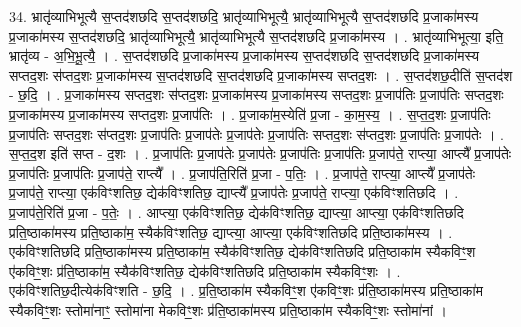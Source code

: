 \documentclass[17pt]{extarticle}
\begin{document}
34. भ्रातृ॑व्याभिभूत्यै स॒प्तद॑शछदि स॒प्तद॑शछदि॒ भ्रातृ॑व्याभिभूत्यै॒ भ्रातृ॑व्याभिभूत्यै स॒प्तद॑शछदि प्र॒जाका॑मस्य प्र॒जाका॑मस्य स॒प्तद॑शछदि॒ भ्रातृ॑व्याभिभूत्यै॒ भ्रातृ॑व्याभिभूत्यै स॒प्तद॑शछदि प्र॒जाका॑मस्य । . भ्रातृ॑व्याभिभूत्या॒ इति॒ भ्रातृ॑व्य - अ॒भि॒भू॒त्यै॒ । . स॒प्तद॑शछदि प्र॒जाका॑मस्य प्र॒जाका॑मस्य स॒प्तद॑शछदि स॒प्तद॑शछदि प्र॒जाका॑मस्य सप्तद॒शः स॑प्तद॒शः प्र॒जाका॑मस्य स॒प्तद॑शछदि स॒प्तद॑शछदि प्र॒जाका॑मस्य सप्तद॒शः । . स॒प्तद॑शछ॒दीति॑ स॒प्तद॑श - छ॒दि॒ । . प्र॒जाका॑मस्य सप्तद॒शः स॑प्तद॒शः प्र॒जाका॑मस्य प्र॒जाका॑मस्य सप्तद॒शः प्र॒जाप॑तिः प्र॒जाप॑तिः सप्तद॒शः प्र॒जाका॑मस्य प्र॒जाका॑मस्य सप्तद॒शः प्र॒जाप॑तिः । . प्र॒जाका॑म॒स्येति॑ प्र॒जा - का॒म॒स्य॒ । . स॒प्त॒द॒शः प्र॒जाप॑तिः प्र॒जाप॑तिः सप्तद॒शः स॑प्तद॒शः प्र॒जाप॑तिः प्र॒जाप॑तेः प्र॒जाप॑तेः प्र॒जाप॑तिः सप्तद॒शः स॑प्तद॒शः प्र॒जाप॑तिः प्र॒जाप॑तेः । . स॒प्त॒द॒श इति॑ सप्त - द॒शः । . प्र॒जाप॑तिः प्र॒जाप॑तेः प्र॒जाप॑तेः प्र॒जाप॑तिः प्र॒जाप॑तिः प्र॒जाप॑ते॒ राप्त्या॒ आप्त्यै᳚ प्र॒जाप॑तेः प्र॒जाप॑तिः प्र॒जाप॑तिः प्र॒जाप॑ते॒ राप्त्यै᳚ । . प्र॒जाप॑ति॒रिति॑ प्र॒जा - प॒तिः॒ । . प्र॒जाप॑ते॒ राप्त्या॒ आप्त्यै᳚ प्र॒जाप॑तेः प्र॒जाप॑ते॒ राप्त्या॒ एक॑विꣳशतिछ॒ द्येक॑विꣳशतिछ॒ द्याप्त्यै᳚ प्र॒जाप॑तेः प्र॒जाप॑ते॒ राप्त्या॒ एक॑विꣳशतिछदि । . प्र॒जाप॑ते॒रिति॑ प्र॒जा - प॒तेः॒ । . आप्त्या॒ एक॑विꣳशतिछ॒ द्येक॑विꣳशतिछ॒ द्याप्त्या॒ आप्त्या॒ एक॑विꣳशतिछदि प्रति॒ष्ठाका॑मस्य प्रति॒ष्ठाका॑म॒ स्यैक॑विꣳशतिछ॒ द्याप्त्या॒ आप्त्या॒ एक॑विꣳशतिछदि प्रति॒ष्ठाका॑मस्य । . एक॑विꣳशतिछदि प्रति॒ष्ठाका॑मस्य प्रति॒ष्ठाका॑म॒ स्यैक॑विꣳशतिछ॒ द्येक॑विꣳशतिछदि प्रति॒ष्ठाका॑म स्यैकविꣳ॒॒श ए॑कविꣳ॒॒शः प्र॑ति॒ष्ठाका॑म॒ स्यैक॑विꣳशतिछ॒ द्येक॑विꣳशतिछदि प्रति॒ष्ठाका॑म स्यैकविꣳ॒॒शः । . एक॑विꣳशतिछ॒दीत्येक॑विꣳशति - छ॒दि॒ । . प्र॒ति॒ष्ठाका॑म स्यैकविꣳ॒॒श ए॑कविꣳ॒॒शः प्र॑ति॒ष्ठाका॑मस्य प्रति॒ष्ठाका॑म स्यैकविꣳ॒॒शः स्तोमा॑नाꣳ॒॒ स्तोमा॑ना मेकविꣳ॒॒शः प्र॑ति॒ष्ठाका॑मस्य प्रति॒ष्ठाका॑म स्यैकविꣳ॒॒शः स्तोमा॑नां । \newline
\end{document}
